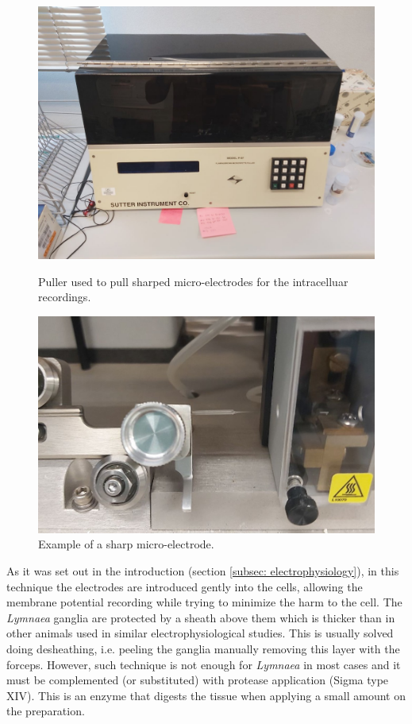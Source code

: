 \begin{figure}[htb!]
	\centering
	\includegraphics[width=0.8\linewidth]{img/methods/preparation/puller.jpg}
	\caption{Puller used to pull sharped micro-electrodes for the intracelluar recordings. }
	\label{fig:puller}
	\endminipage\qquad
	\hspace*{-3mm}
	\centering
	\includegraphics[width=0.85\linewidth]{img/methods/preparation/electrode4_zoom.jpg}
	\caption{Example of a sharp micro-electrode.}
	\label{fig:electrode}
	\endminipage\qquad
\end{figure}

As it was set out in the introduction (section \ref{subsec: electrophysiology}), in this technique the electrodes are introduced gently into the cells, allowing the membrane potential recording while trying to minimize the harm to the cell. The \textit{Lymnaea} ganglia are protected by a sheath above them which is thicker than in other animals used in similar  electrophysiological studies. This is usually solved doing desheathing, i.e. peeling the ganglia manually removing this layer with the forceps. However, such technique is not enough for \textit{Lymnaea} in most cases and it must be complemented (or substituted) with protease application (Sigma type XIV). This is an enzyme that digests the tissue when applying a small amount on the preparation.

